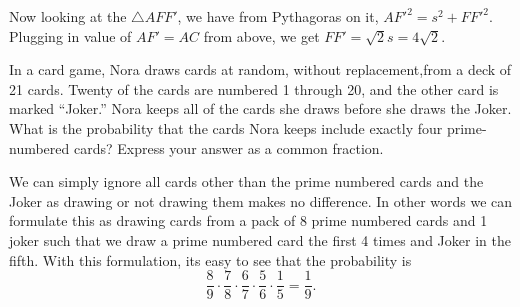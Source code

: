 \documentclass[11pt,twoside]{scrartcl}
\begin{document}
\begin{problem}
\begin{sketch}
        Now looking at the $\triangle AFF'$, we have from Pythagoras on it, $AF'^2 = s^2 + FF'^2$. Plugging in value of $AF' = AC$ from above, we get $FF' = \sqrt{2}s = \boxed{4\sqrt{2}}.$
    \end{sketch}
\end{problem}

\begin{problem}
    In a card game, Nora draws cards at random, without replacement,from a deck of 21 cards. Twenty of the cards are numbered 1 through 20, and the other card is marked ``Joker.'' Nora keeps all of the cards she draws before she draws the Joker. What is the probability that the cards Nora keeps include exactly four prime-numbered cards? Express your answer as a common fraction.
    \begin{sketch}
        We can simply ignore all cards other than the prime numbered cards and the Joker as drawing or not drawing them makes no difference. In other words we can formulate this as drawing cards from a pack of 8 prime numbered cards and 1 joker such that we draw a prime numbered card the first 4 times and Joker in the fifth. With this formulation, its easy to see that the probability is
        \[\frac{8}{9} \cdot \frac{7}{8} \cdot\frac{6}{7} \cdot\frac{5}{6} \cdot\frac{1}{5} = \boxed{\frac{1}{9}}. \] 
    \end{sketch}
\end{problem}
\end{document}
